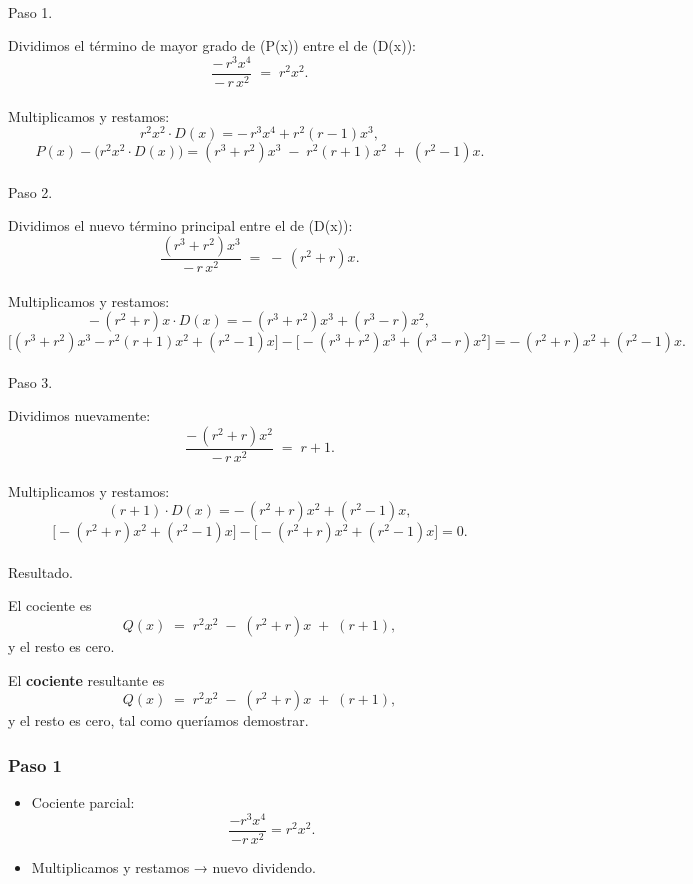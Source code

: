 \documentclass[
  11pt,
  a4paper,
  DIV=11,
  numbers=noendperiod]{scrreprt}
\makeatletter
\let\oldparagraph\paragraph
\renewcommand{\paragraph}{
    \@ifstar
      \xxxParagraphStar
      \xxxParagraphNoStar
  }
\newcommand{\xxxParagraphStar}[1]{\oldparagraph*{#1}\mbox{}}
\newcommand{\xxxParagraphNoStar}[1]{\oldparagraph{#1}\mbox{}}
\providecommand{\tightlist}{%
  \setlength{\itemsep}{0pt}\setlength{\parskip}{0pt}}
\makeatother
\begin{document}
\paragraph{Paso 1.}

Dividimos el término de mayor grado de (P(x)) entre el de (D(x)): \[
\frac{-\,r^3x^4}{-\,r\,x^2}
\;=\;
r^2x^2.
\]\\
Multiplicamos y restamos: \[
r^2x^2\cdot D(x)
= -\,r^3x^4 + r^2(r-1)x^3,
\] \[
P(x)-\bigl(r^2x^2\cdot D(x)\bigr)
= (r^3+r^2)x^3 \;-\; r^2(r+1)x^2 \;+\;(r^2-1)x.
\]

\paragraph{Paso 2.}

Dividimos el nuevo término principal entre el de (D(x)): \[
\frac{(r^3+r^2)x^3}{-\,r\,x^2}
\;=\;
-\,(r^2+r)x.
\]\\
Multiplicamos y restamos: \[
-\,(r^2+r)x\cdot D(x)
= -\,(r^3+r^2)x^3 + (r^3-r)x^2,
\] \[
\bigl[(r^3+r^2)x^3 - r^2(r+1)x^2 + (r^2-1)x\bigr]
-
\bigl[-(r^3+r^2)x^3 + (r^3-r)x^2\bigr]
= -\,(r^2+r)x^2 + (r^2-1)x.
\]

\paragraph{Paso 3.}

Dividimos nuevamente: \[
\frac{-\,(r^2+r)x^2}{-\,r\,x^2}
\;=\;
r+1.
\]\\
Multiplicamos y restamos: \[
(r+1)\cdot D(x)
= -\,(r^2+r)x^2 + (r^2-1)x,
\] \[
\bigl[-(r^2+r)x^2 + (r^2-1)x\bigr]
-
\bigl[-(r^2+r)x^2 + (r^2-1)x\bigr]
= 0.
\]

\paragraph{Resultado.}

El cociente es \[
Q(x) \;=\; r^2x^2 \;-\;(r^2+r)x \;+\;(r+1),
\] y el resto es cero.

El \textbf{cociente} resultante es \[
Q(x) \;=\; r^2x^2 \;-\;(r^2+r)x \;+\;(r+1),
\] y el resto es cero, tal como queríamos demostrar.

\subsubsection{Paso 1}\label{paso-1}

\begin{itemize}
\tightlist
\item
  Cociente parcial:\\
  \[
  \frac{-r^3x^4}{-r\,x^2} = r^2x^2.
  \]
\item
  Multiplicamos y restamos → nuevo dividendo.
\end{itemize}
\end{document}
